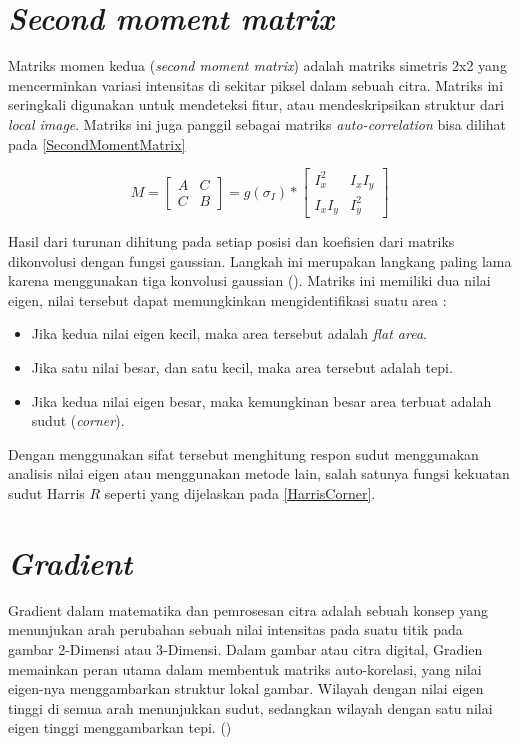 \section{\emph{Second moment matrix}}
  Matriks momen kedua (\emph{second moment matrix}) adalah matriks simetris 2x2 yang mencerminkan variasi intensitas di sekitar piksel dalam sebuah citra. Matriks ini seringkali digunakan untuk mendeteksi fitur, atau mendeskripsikan struktur dari \emph{local image}.
Matriks ini juga panggil sebagai matriks \emph{auto-correlation} bisa dilihat pada \ref{SecondMomentMatrix}

\begin{equation}
  M = 
    \begin{bmatrix}
      A & C \\
      C & B
    \end{bmatrix}
    = g(\sigma_{I}) *
      \begin{bmatrix}
        I_{x}^2 & I_{x}I_{y} \\
        I_{x}I_{y} & I_{y}^2
      \end{bmatrix}
  \label{SecondMomentMatrix}
\end{equation}

Hasil dari turunan dihitung pada setiap posisi dan koefisien dari matriks dikonvolusi dengan fungsi gaussian. Langkah ini merupakan langkang paling lama karena menggunakan tiga konvolusi gaussian (\cite{Sanchez2018}). 
Matriks ini memiliki dua nilai eigen, nilai tersebut dapat memungkinkan mengidentifikasi suatu area :

\begin{itemize}
  \item Jika kedua nilai eigen kecil, maka area tersebut adalah \emph{flat area}.
  \item Jika satu nilai besar, dan satu kecil, maka area tersebut adalah tepi.
  \item Jika kedua nilai eigen besar, maka kemungkinan besar area terbuat adalah sudut (\emph{corner}).
\end{itemize}

Dengan menggunakan sifat tersebut menghitung respon sudut menggunakan analisis nilai eigen atau menggunakan metode lain, salah satunya fungsi kekuatan sudut Harris \(R\) seperti yang dijelaskan pada \ref{HarrisCorner}.

\section{\emph{Gradient}}
  Gradient dalam matematika dan pemrosesan citra adalah sebuah konsep yang menunjukan arah perubahan sebuah nilai intensitas pada suatu titik pada gambar 2-Dimensi atau 3-Dimensi. 
Dalam gambar atau citra digital, Gradien memainkan peran utama dalam membentuk matriks auto-korelasi, yang nilai eigen-nya menggambarkan struktur lokal gambar. 
Wilayah dengan nilai eigen tinggi di semua arah menunjukkan sudut, sedangkan wilayah dengan satu nilai eigen tinggi menggambarkan tepi. (\cite{Harris2013})

